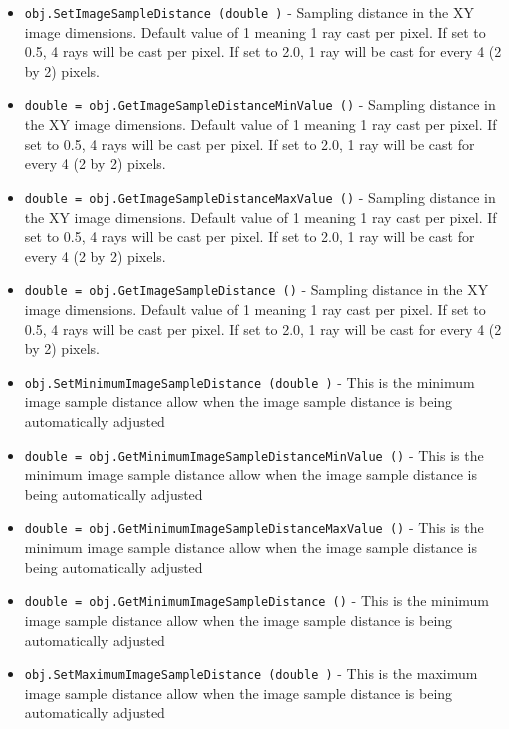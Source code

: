 \begin{itemize}
\item  \verb|obj.SetImageSampleDistance (double )| -  Sampling distance in the XY image dimensions. Default value of 1 meaning
 1 ray cast per pixel. If set to 0.5, 4 rays will be cast per pixel. If
 set to 2.0, 1 ray will be cast for every 4 (2 by 2) pixels.

\item  \verb|double = obj.GetImageSampleDistanceMinValue ()| -  Sampling distance in the XY image dimensions. Default value of 1 meaning
 1 ray cast per pixel. If set to 0.5, 4 rays will be cast per pixel. If
 set to 2.0, 1 ray will be cast for every 4 (2 by 2) pixels.

\item  \verb|double = obj.GetImageSampleDistanceMaxValue ()| -  Sampling distance in the XY image dimensions. Default value of 1 meaning
 1 ray cast per pixel. If set to 0.5, 4 rays will be cast per pixel. If
 set to 2.0, 1 ray will be cast for every 4 (2 by 2) pixels.

\item  \verb|double = obj.GetImageSampleDistance ()| -  Sampling distance in the XY image dimensions. Default value of 1 meaning
 1 ray cast per pixel. If set to 0.5, 4 rays will be cast per pixel. If
 set to 2.0, 1 ray will be cast for every 4 (2 by 2) pixels.

\item  \verb|obj.SetMinimumImageSampleDistance (double )| -  This is the minimum image sample distance allow when the image
 sample distance is being automatically adjusted

\item  \verb|double = obj.GetMinimumImageSampleDistanceMinValue ()| -  This is the minimum image sample distance allow when the image
 sample distance is being automatically adjusted

\item  \verb|double = obj.GetMinimumImageSampleDistanceMaxValue ()| -  This is the minimum image sample distance allow when the image
 sample distance is being automatically adjusted

\item  \verb|double = obj.GetMinimumImageSampleDistance ()| -  This is the minimum image sample distance allow when the image
 sample distance is being automatically adjusted

\item  \verb|obj.SetMaximumImageSampleDistance (double )| -  This is the maximum image sample distance allow when the image
 sample distance is being automatically adjusted


\end{itemize}
